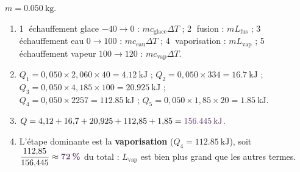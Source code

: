 \documentclass[11pt,a4paper]{article}
\newcommand{\rep}[1]{\textcolor{primarydark}{\textbf{#1}}}
\begin{document}
\begin{center}
\end{center}

\begin{correction}
$m=\SI{0.050}{\kilogram}$.
\begin{enumerate}[label=\alph*),leftmargin=2em,topsep=2pt,itemsep=2pt]
  \item \textcircled{1} échauffement glace $-40\to0$ : $m c_{\text{glace}}\Delta T$ ; \textcircled{2} fusion : $mL_{\text{fus}}$ ;
        \textcircled{3} échauffement eau $0\to100$ : $m c_{\text{eau}}\Delta T$ ; \textcircled{4} vaporisation : $mL_{\text{vap}}$ ;
        \textcircled{5} échauffement vapeur $100\to120$ : $m c_{\text{vap}}\Delta T$.
  \item $Q_1 = 0{,}050\times2{,}060\times40 = \SI{4.12}{\kilo\joule}$ ;\;
        $Q_2 = 0{,}050\times334 = \SI{16.7}{\kilo\joule}$ ;\;
        $Q_3 = 0{,}050\times4{,}185\times100 = \SI{20.925}{\kilo\joule}$ ;\\
        $Q_4 = 0{,}050\times2257 = \SI{112.85}{\kilo\joule}$ ;\;
        $Q_5 = 0{,}050\times1{,}85\times20 = \SI{1.85}{\kilo\joule}$.
  \item $Q = 4{,}12+16{,}7+20{,}925+112{,}85+1{,}85 = \rep{\SI{156.445}{\kilo\joule}}$.
  \item L'étape dominante est la \rep{vaporisation} ($Q_4=\SI{112.85}{\kilo\joule}$), soit
        $\dfrac{112{,}85}{156{,}445}\approx \rep{72\,\%}$ du total : $L_{\text{vap}}$ est bien plus grand
        que les autres termes.
\end{enumerate}
\end{correction}
\end{document}
